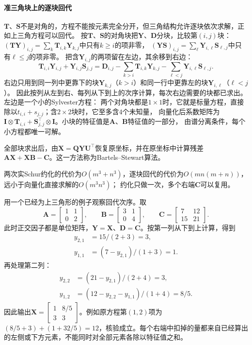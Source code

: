 \paragraph{准三角块上的逐块回代}

$\bm T$、$\bm S$不是对角的，方程不能按元素完全分开，但三角结构允许逐块依次求解，正如上三角方程可以回代。
按$\bm T$、$\bm S$的对角块把$\bm Y$、$\bm D$分块，比较第$(i,j)$块：
$(\bm T\bm Y)_{i,j}=\sum_k\bm T_{i,k}\bm Y_{k,j}$中只有$k\geq i$的项非零，
$(\bm Y\bm S)_{i,j}=\sum_\ell\bm Y_{i,\ell}\bm S_{\ell,j}$中只有$\ell\leq j$的项非零。
把含$\bm Y_{i,j}$的两项留在左边，其余移到右边：
\begin{equation}
 \bm T_{i,i}\bm Y_{i,j}+\bm Y_{i,j}\bm S_{j,j}
 =\bm D_{i,j}-\sum_{k>i}\bm T_{i,k}\bm Y_{k,j}
          -\sum_{\ell<j}\bm Y_{i,\ell}\bm S_{\ell,j}.
 \label{eq:ls-sylvester-block-recurrence}
\end{equation}
右边只用到同一列中更靠下的块$\bm Y_{k,j}$（$k>i$）和同一行中更靠左的块$\bm Y_{i,\ell}$（$\ell<j$）。
因此按列从左到右、每列从下到上的次序计算，每次右边需要的块都已求出。左边是一个小的Sylvester方程：
两个对角块都是$1\times1$时，它就是标量方程，直接除以$t_{i,i}+s_{j,j}$；含$2\times2$块时，它至多含$4$个未知量，
向量化后系数矩阵为$\bm I\otimes\bm T_{i,i}+\bm S_{j,j}^\top\otimes\bm I$。小块的特征值是$\bm A$、$\bm B$特征值的一部分，
由谱分离条件，每个小方程都唯一可解。

全部块求出后，由$\bm X=\bm Q\bm Y\bm U^\top$恢复原坐标，并在原坐标中计算残差$\bm A\bm X+\bm X\bm B-\bm C$。这一方法称为Bartels--Stewart算法。

两次实Schur约化的代价为$O(m^3+n^3)$，逐块回代的代价为$O(mn(m+n))$，远小于向量化直接求解的$O(m^3n^3)$；
约化只做一次，多个右端$\bm C$可以复用。

用一个已经为上三角形的例子观察回代次序。取
\[
 \bm A=\begin{bmatrix}1&1\\0&2\end{bmatrix},\qquad
 \bm B=\begin{bmatrix}3&1\\0&4\end{bmatrix},\qquad
 \bm C=\begin{bmatrix}7&12\\15&21\end{bmatrix}.
\]
此时正交因子都是单位矩阵，$\bm Y=\bm X$、$\bm D=\bm C$。按第一列从下到上计算，得到
\begin{align*}
 y_{2,1}&=15/(2+3)=3,\\
 y_{1,1}&=(7-y_{2,1})/(1+3)=1.
\end{align*}
再处理第二列：
\begin{align*}
 y_{2,2}&=(21-y_{2,1})/(2+4)=3,\\
 y_{1,2}&=(12-y_{2,2}-y_{1,1})/(1+4)=8/5.
\end{align*}
因此输出$\bm X=\left[\begin{smallmatrix}1&8/5\\3&3\end{smallmatrix}\right]$。例如原方程第$(1,2)$项为$(8/5+3)+(1+32/5)=12$，核验成立。每个右端中扣掉的量都来自已经算出的左侧或下方元素，不能同时对全部元素各除以特征值之和。

